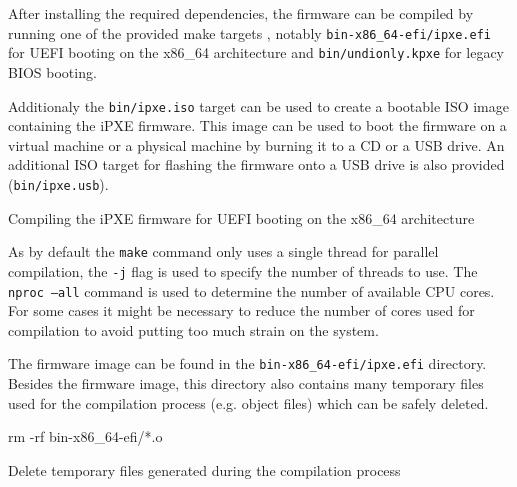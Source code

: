 \documentclass[../main.tex]{subfiles}
\begin{document}
After installing the required dependencies, the firmware can be compiled by running
one of the provided make targets \cite{ipxe_build_targets}, notably \texttt{bin-x86\_64-efi/ipxe.efi} for UEFI
booting on the x86\_64 architecture and \texttt{bin/undionly.kpxe} for legacy BIOS booting.

Additionaly the \texttt{bin/ipxe.iso} target can be used to create a bootable ISO image containing the iPXE firmware.
This image can be used to boot the firmware on a virtual machine or a physical machine by burning it to a CD or a USB drive.
An additional ISO target for flashing the firmware onto a USB drive is also provided (\texttt{bin/ipxe.usb}).

\begin{listing}[H]

  \caption{Compiling the iPXE firmware for UEFI booting on the x86\_64 architecture}
\end{listing}

As by default the \texttt{make} command only uses a single
thread for parallel compilation, the \texttt{-j} flag is used to specify the number of threads to use.
The \texttt{nproc --all} command is used to determine the number of available CPU cores.
For some cases it might be necessary to reduce the number of cores used for compilation
to avoid putting too much strain on the system.

The firmware image can be found in the \texttt{bin-x86\_64-efi/ipxe.efi} directory.
Besides the firmware image, this directory also contains many temporary files used for the compilation process (e.g. object files)
which can be safely deleted.

\begin{listing}[H]
  \begin{bashcode}
    rm -rf bin-x86_64-efi/*.o
  \end{bashcode}

  \caption{Delete temporary files generated during the compilation process}
\end{listing}
\end{document}
